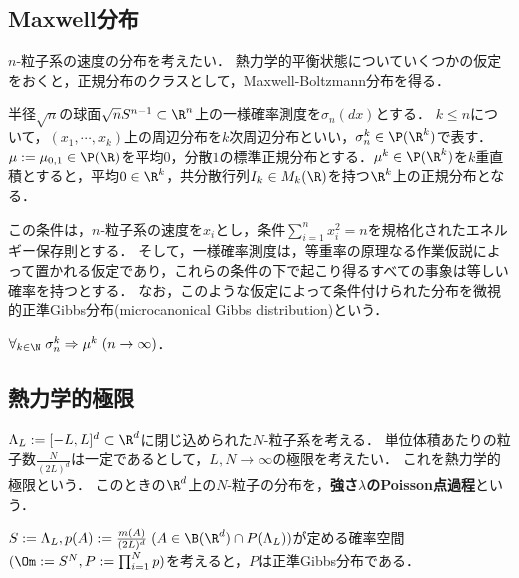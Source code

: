 \documentclass[uplatex,dvipdfmx]{jsreport}
\begin{document}
\subsection{Maxwell分布}

\begin{tcolorbox}[colframe=ForestGreen, colback=ForestGreen!10!white,breakable,colbacktitle=ForestGreen!40!white,coltitle=black,fonttitle=\bfseries\sffamily,
title=]
    $n$-粒子系の速度の分布を考えたい．
    熱力学的平衡状態についていくつかの仮定をおくと，正規分布のクラスとして，Maxwell-Boltzmann分布を得る．
\end{tcolorbox}

\begin{notation}
    半径$\sqrt{n}$の球面$\sqrt{n}S^{n-1}\subset\R^n$上の一様確率測度を$\sigma_n(dx)$とする．
    $k\le n$について，$(x_1,\cdots,x_k)$上の周辺分布を$k$次周辺分布といい，$\sigma^k_n\in\P(\R^k)$で表す．
    $\mu:=\mu_{0,1}\in\P(\R)$を平均$0$，分散$1$の標準正規分布とする．$\mu^k\in\P(\R^k)$を$k$重直積とすると，平均$0\in\R^k$，共分散行列$I_k\in M_k(\R)$を持つ$\R^k$上の正規分布となる．
\end{notation}
\begin{remarks}
    この条件は，$n$-粒子系の速度を$x_i$とし，条件$\sum_{i=1}^nx_i^2=n$を規格化されたエネルギー保存則とする．
    そして，一様確率測度は，等重率の原理なる作業仮説によって置かれる仮定であり，これらの条件の下で起こり得るすべての事象は等しい確率を持つとする．
    なお，このような仮定によって条件付けられた分布を微視的正準Gibbs分布(microcanonical Gibbs distribution)という．
\end{remarks}

\begin{theorem}
    $\forall_{k\in\N}\;\sigma^k_n\Rightarrow\mu^k\;(n\to\infty)$．
\end{theorem}

\subsection{熱力学的極限}

\begin{notation}
    $\Lambda_L:=[-L,L]^d\subset\R^d$に閉じ込められた$N$-粒子系を考える．
    単位体積あたりの粒子数$\frac{N}{(2L)^d}$は一定であるとして，$L,N\to\infty$の極限を考えたい．
    これを熱力学的極限という．
    このときの$\R^d$上の$N$-粒子の分布を，\textbf{強さ$\lambda$のPoisson点過程}という．

    $S:=\Lambda_L,p(A):=\frac{m(A)}{(2L)^d}\;(A\in\B(\R^d)\cap P(\Lambda_L))$が定める確率空間$(\Om:=S^N,P:=\prod_{i=1}^Np)$を考えると，$P$は正準Gibbs分布である．
\end{notation}
\end{document}
